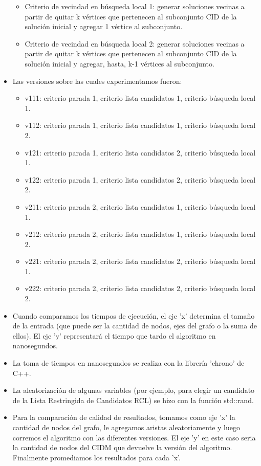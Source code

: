 \begin{itemize}
\begin{itemize}
        \item Criterio de vecindad en búsqueda local 1: generar soluciones vecinas a partir de quitar k vértices que pertenecen al subconjunto CID de la solución inicial y agregar 1 vértice al subconjunto.
        \item Criterio de vecindad en búsqueda local 2: generar soluciones vecinas a partir de quitar k vértices que pertenecen al subconjunto CID de la solución inicial y agregar, hasta, k-1 vértices al subconjunto.
    \end{itemize}
    \item Las versiones sobre las cuales experimentamos fueron:
    \begin{itemize}
        \item v111: criterio parada 1, criterio lista candidatos 1, criterio búsqueda local 1.
        \item v112: criterio parada 1, criterio lista candidatos 1, criterio búsqueda local 2.
        \item v121: criterio parada 1, criterio lista candidatos 2, criterio búsqueda local 1.
        \item v122: criterio parada 1, criterio lista candidatos 2, criterio búsqueda local 2.
        \item v211: criterio parada 2, criterio lista candidatos 1, criterio búsqueda local 1.
        \item v212: criterio parada 2, criterio lista candidatos 1, criterio búsqueda local 2.
        \item v221: criterio parada 2, criterio lista candidatos 2, criterio búsqueda local 1.
        \item v222: criterio parada 2, criterio lista candidatos 2, criterio búsqueda local 2.
    \end{itemize}
    \item Cuando comparamos los tiempos de ejecución, el eje 'x' determina el tamaño de la entrada (que puede ser la cantidad de nodos, ejes del grafo o la suma de ellos). El eje 'y' representará el tiempo que tardo el algoritmo en nanosegundos.
    \item La toma de tiempos en nanosegundos se realiza con la librería 'chrono' de C++.
    \item La aleatorización de algunas variables (por ejemplo, para elegir un candidato de la Lista Restringida de Candidatos RCL) se hizo con la función std::rand.
    \item Para la comparación de calidad de resultados, tomamos como eje 'x' la cantidad de nodos del grafo, le agregamos aristas aleatoriamente y luego corremos el algoritmo con las diferentes versiones. El eje 'y' en este caso seria la cantidad de nodos del CIDM que devuelve la versión del algoritmo. Finalmente promediamos los resultados para cada 'x'.

\end{itemize}

